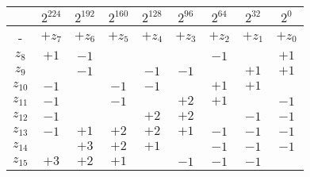 \begin{table}[h!]\centering
\begin{tabular}{c|cccccccc}
& $2^{224}$ & $2^{192}$ & $2^{160}$ & $2^{128}$ & $2^{96}$ & $2^{64}$ & $2^{32}$ & $2^{0}$ \\
\hline\hline
- & $+z_7$ & $+z_6$ & $+z_5$ & $+z_4$ & $+z_3$ & $+z_2$ & $+z_1$ & $+z_0$ \\
$z_8$ 	 & $+1$ & $-1$ & & & & $-1$ & & $+1$ \\
$z_9$ 	 &  & $-1$ & & $-1$ & $-1$ & & $+1$ & $+1$ \\
$z_{10}$ & $-1$ & & $-1$ & $-1$ & & $+1$ & $+1$ & \\
$z_{11}$ & $-1$ & & $-1$ & & $+2$ & $+1$ & & $-1$ \\
$z_{12}$ & $-1$ & & & $+2$ & $+2$ & & $-1$ & $-1$ \\
$z_{13}$ & $-1$ & $+1$ & $+2$ & $+2$ & $+1$ & $-1$ & $-1$ & $-1$ \\
$z_{14}$ &  & $+3$ & $+2$ & $+1$ & & $-1$ & $-1$ & $-1$ \\
$z_{15}$ & $+3$ & $+2$ & $+1$ & & $-1$ & $-1$ & $-1$ & \\
\end{tabular}
\end{table}

